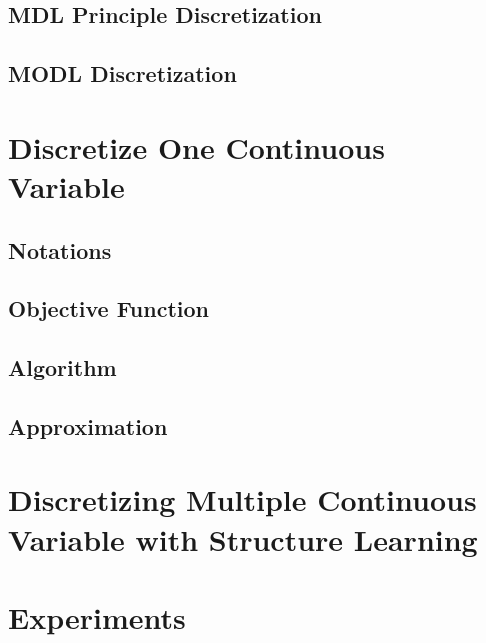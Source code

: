\subsection{MDL Principle Discretization}
\label{MDL}

\subsection{MODL Discretization}
\label{MODL}

\section{Discretize One Continuous Variable}
\label{one-conti}

\subsection{Notations}
\label{Notation}

\subsection{Objective Function}
\label{obj}

\subsection{Algorithm}
\label{algo}

\subsection{Approximation}
\label{approx}

\section{Discretizing Multiple Continuous Variable with Structure Learning}
\label{multiple-conti}

\section{Experiments}











